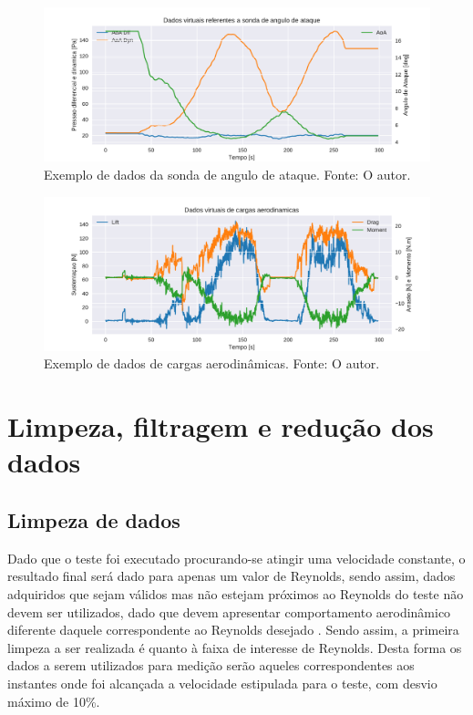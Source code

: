 \begin{figure}[!ht]
    \centering
    \includegraphics[width=.8\linewidth]{plots/aoa_plots.pdf}
    \caption{Exemplo de dados da sonda de angulo de ataque. Fonte: O autor.}
    \label{fig:raw_aoa_plots}
\end{figure}

\begin{figure}[!ht]
    \centering
    \includegraphics[width=.8\linewidth]{plots/loads_plots.pdf}
    \caption{Exemplo de dados de cargas aerodinâmicas. Fonte: O autor.}
    \label{fig:raw_load_plots}
\end{figure}

\section{Limpeza, filtragem e redução dos dados}

\subsection{Limpeza de dados}

Dado que o teste foi executado procurando-se atingir uma velocidade constante, o resultado final será dado para apenas um valor de Reynolds, sendo assim, dados adquiridos que sejam válidos mas não estejam próximos ao Reynolds do teste não devem ser utilizados, dado que devem apresentar comportamento aerodinâmico diferente daquele correspondente ao Reynolds desejado \citep{anderson1984fundamentals}. Sendo assim, a primeira limpeza a ser realizada é quanto à faixa de interesse de Reynolds. Desta forma os dados a serem utilizados para medição serão aqueles correspondentes aos instantes onde foi alcançada a velocidade estipulada para o teste, com desvio máximo de 10\%.

